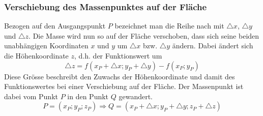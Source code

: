 \subsubsection{Verschiebung des Massenpunktes auf der Fläche}
Bezogen auf den Ausgangspunkt $P$ bezeichnet man die Reihe nach mit $\triangle x$, $\triangle y$ und $\triangle z$. Die Masse wird nun so auf der Fläche verschoben, dass sich seine beiden unabhängigen Koordinaten $x$ und $y$ um $\triangle x$ bzw. $\triangle y$ ändern. Dabei ändert sich die Höhenkoordinate $z$, d.h. der Funktionswert um
\begin{equation} 
\boxed{\triangle z=f\left(x_P+\triangle x; y_P+\triangle y\right)-f\left(x_P; y_P\right)}
\end{equation} 
Diese Grösse beschreibt den Zuwachs der Höhenkoordinate und damit des Funktionswertes bei einer Verschiebung auf der Fläche. Der Massenpunkt ist dabei vom Punkt $P$ in den Punkt $Q$ gewandert.
\begin{equation}
\boxed{P=\left(x_P; y_P; z_P\right)\Longrightarrow Q=\left(x_P+\triangle x; y_P+\triangle y; z_P+\triangle z\right)}
\end{equation}
